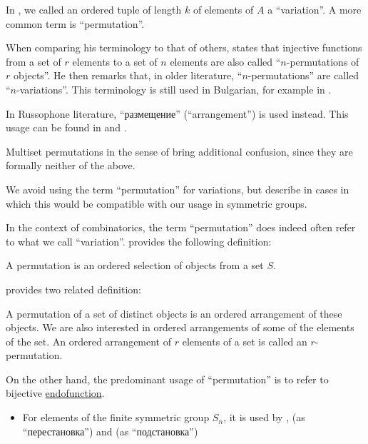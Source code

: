 \begin{remark}\label{rem:combinatorial_permutation_terminology}
  In , we called an ordered tuple of length \( k \) of elements of \( A \) a \enquote{variation}. A more common term is \enquote{permutation}.

  When comparing his terminology to that of others,  states that injective functions from a set of \( r \) elements to a set of \( n \) elements are also called \enquote{\( n \)-permutations of \( r \) objects}. He then remarks that, in older literature, \enquote{\( n \)-permutations} are called \enquote{\( n \)-variations}. This terminology is still used in Bulgarian, for example in \cite[27]{ДимитровЯнев2007Статистика}.

  In Russophone literature, \enquote{размещение} (\enquote{arrangement}) is used instead. This usage can be found in  and .

  Multiset permutations in the sense of  bring additional confusion, since they are formally neither of the above.

  We avoid using the term \enquote{permutation} for variations, but describe in  cases in which this would be compatible with our usage in symmetric groups.

  In the context of combinatorics, the term \enquote{permutation} does indeed often refer to what we call \enquote{variation}.  provides the following definition:
  \begin{displayquote}
    A permutation is an ordered selection of objects from a set \( S \).
  \end{displayquote}

   provides two related definition:
  \begin{displayquote}
    A permutation of a set of distinct objects is an ordered arrangement of these objects. We are also interested in ordered arrangements of some of the elements of the set. An ordered arrangement of \( r \) elements of a set is called an \( r \)-permutation.
  \end{displayquote}

  On the other hand, the predominant usage of \enquote{permutation} is to refer to bijective \hyperref[def:function/endofunction]{endofunction}.
  \begin{itemize}
    \item For elements of the finite symmetric group \( S_n \), it is used by
    ,
     (as \enquote{перестановка}) and
     (as \enquote{подстановка})


\end{itemize}
\end{remark}
